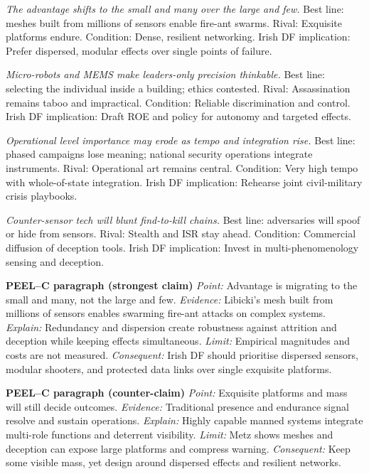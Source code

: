 \textit{The advantage shifts to the small and many over the large and few.} Best line: meshes built from millions of sensors enable fire-ant swarms. Rival: Exquisite platforms endure. Condition: Dense, resilient networking. Irish DF implication: Prefer dispersed, modular effects over single points of failure.

\textit{Micro-robots and MEMS make leaders-only precision thinkable.} Best line: selecting the individual inside a building; ethics contested. Rival: Assassination remains taboo and impractical. Condition: Reliable discrimination and control. Irish DF implication: Draft ROE and policy for autonomy and targeted effects.

\textit{Operational level importance may erode as tempo and integration rise.} Best line: phased campaigns lose meaning; national security operations integrate instruments. Rival: Operational art remains central. Condition: Very high tempo with whole-of-state integration. Irish DF implication: Rehearse joint civil-military crisis playbooks.

\textit{Counter-sensor tech will blunt find-to-kill chains.} Best line: adversaries will spoof or hide from sensors. Rival: Stealth and ISR stay ahead. Condition: Commercial diffusion of deception tools. Irish DF implication: Invest in multi-phenomenology sensing and deception.

\textbf{PEEL–C paragraph (strongest claim)}
\textit{Point:} Advantage is migrating to the small and many, not the large and few.
\textit{Evidence:} Libicki’s mesh built from millions of sensors enables swarming fire-ant attacks on complex systems.
\textit{Explain:} Redundancy and dispersion create robustness against attrition and deception while keeping effects simultaneous.
\textit{Limit:} Empirical magnitudes and costs are not measured.
\textit{Consequent:} Irish DF should prioritise dispersed sensors, modular shooters, and protected data links over single exquisite platforms.

\textbf{PEEL–C paragraph (counter-claim)}
\textit{Point:} Exquisite platforms and mass will still decide outcomes.
\textit{Evidence:} Traditional presence and endurance signal resolve and sustain operations.
\textit{Explain:} Highly capable manned systems integrate multi-role functions and deterrent visibility.
\textit{Limit:} Metz shows meshes and deception can expose large platforms and compress warning.
\textit{Consequent:} Keep some visible mass, yet design around dispersed effects and resilient networks.

